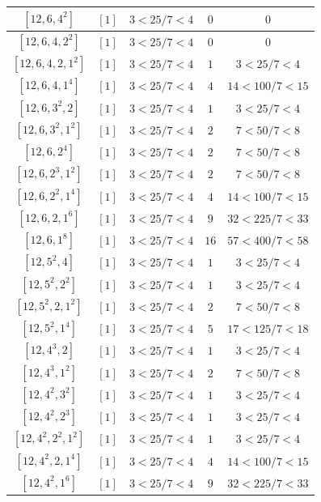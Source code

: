 \documentclass{article}%
\begin{document}
\begin{center}
\begin{longtable}{||c|c|c|c|c||}
$[12, 6, 4^{2}]$ & $[1]$ & $3 < 25/7 < 4$ & $0$ & $0$ \\ \hline 
$[12, 6, 4, 2^{2}]$ & $[1]$ & $3 < 25/7 < 4$ & $0$ & $0$ \\ \hline 
$[12, 6, 4, 2, 1^{2}]$ & $[1]$ & $3 < 25/7 < 4$ & $1$ & $3 < 25/7 < 4$ \\ \hline 
$[12, 6, 4, 1^{4}]$ & $[1]$ & $3 < 25/7 < 4$ & $4$ & $14 < 100/7 < 15$ \\ \hline 
$[12, 6, 3^{2}, 2]$ & $[1]$ & $3 < 25/7 < 4$ & $1$ & $3 < 25/7 < 4$ \\ \hline 
$[12, 6, 3^{2}, 1^{2}]$ & $[1]$ & $3 < 25/7 < 4$ & $2$ & $7 < 50/7 < 8$ \\ \hline 
$[12, 6, 2^{4}]$ & $[1]$ & $3 < 25/7 < 4$ & $2$ & $7 < 50/7 < 8$ \\ \hline 
$[12, 6, 2^{3}, 1^{2}]$ & $[1]$ & $3 < 25/7 < 4$ & $2$ & $7 < 50/7 < 8$ \\ \hline 
$[12, 6, 2^{2}, 1^{4}]$ & $[1]$ & $3 < 25/7 < 4$ & $4$ & $14 < 100/7 < 15$ \\ \hline 
$[12, 6, 2, 1^{6}]$ & $[1]$ & $3 < 25/7 < 4$ & $9$ & $32 < 225/7 < 33$ \\ \hline 
$[12, 6, 1^{8}]$ & $[1]$ & $3 < 25/7 < 4$ & $16$ & $57 < 400/7 < 58$ \\ \hline 
$[12, 5^{2}, 4]$ & $[1]$ & $3 < 25/7 < 4$ & $1$ & $3 < 25/7 < 4$ \\ \hline 
$[12, 5^{2}, 2^{2}]$ & $[1]$ & $3 < 25/7 < 4$ & $1$ & $3 < 25/7 < 4$ \\ \hline 
$[12, 5^{2}, 2, 1^{2}]$ & $[1]$ & $3 < 25/7 < 4$ & $2$ & $7 < 50/7 < 8$ \\ \hline 
$[12, 5^{2}, 1^{4}]$ & $[1]$ & $3 < 25/7 < 4$ & $5$ & $17 < 125/7 < 18$ \\ \hline 
$[12, 4^{3}, 2]$ & $[1]$ & $3 < 25/7 < 4$ & $1$ & $3 < 25/7 < 4$ \\ \hline 
$[12, 4^{3}, 1^{2}]$ & $[1]$ & $3 < 25/7 < 4$ & $2$ & $7 < 50/7 < 8$ \\ \hline 
$[12, 4^{2}, 3^{2}]$ & $[1]$ & $3 < 25/7 < 4$ & $1$ & $3 < 25/7 < 4$ \\ \hline 
$[12, 4^{2}, 2^{3}]$ & $[1]$ & $3 < 25/7 < 4$ & $1$ & $3 < 25/7 < 4$ \\ \hline 
$[12, 4^{2}, 2^{2}, 1^{2}]$ & $[1]$ & $3 < 25/7 < 4$ & $1$ & $3 < 25/7 < 4$ \\ \hline 
$[12, 4^{2}, 2, 1^{4}]$ & $[1]$ & $3 < 25/7 < 4$ & $4$ & $14 < 100/7 < 15$ \\ \hline 
$[12, 4^{2}, 1^{6}]$ & $[1]$ & $3 < 25/7 < 4$ & $9$ & $32 < 225/7 < 33$ \\ \hline 

\end{longtable}
\end{center}
\end{document}
